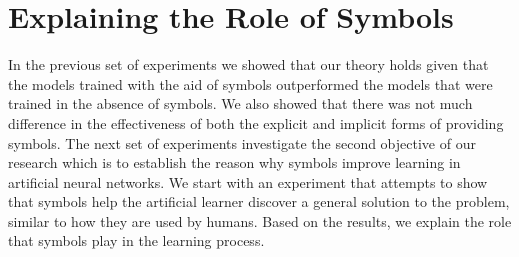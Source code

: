 \section{Explaining the Role of Symbols} \label{sec:empirical-studies-explaining-the-role-of-symbols}

In the previous set of experiments we showed that our theory holds given that the models trained with the aid of symbols outperformed the models that were trained in the absence of symbols. We also showed that there was not much difference in the effectiveness of both the explicit and implicit forms of providing symbols. The next set of experiments investigate the second objective of our research which is to establish the reason why symbols improve learning in artificial neural networks. We start with an experiment that attempts to show that symbols help the artificial learner discover a general solution to the problem, similar to how they are used by humans. Based on the results, we explain the role that symbols play in the learning process.



